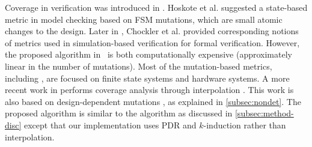 Coverage in verification was introduced in \cite{hoskote1999coverage, katz1999have}. Hoskote et al. \cite{hoskote1999coverage} suggested a state-based metric in model checking based on FSM mutations, which are small atomic changes to the design. %
Later in \cite{chockler_coverage_2003}, Chockler et al. provided corresponding notions of metrics used in simulation-based verification for formal verification. %
However, the proposed algorithm in~\cite{chockler_coverage_2003} is both computationally expensive (approximately linear in the number of mutations). Most of the mutation-based metrics, including \cite{kupferman_theory_2008, chockler2001practical}, are focused on finite state systems and hardware systems. A more recent work in \cite{chockler2010coverage} performs coverage analysis through interpolation \cite{mcmillan2003interpolation}. This work is also based on design-dependent mutations \cite{chockler_coverage_2003}, as explained in \ref{subsec:nondet}. The proposed algorithm is similar to the \mustalg algorithm as discussed in \ref{subsec:method-disc} except that our implementation uses PDR and $k$-induction rather than interpolation.

